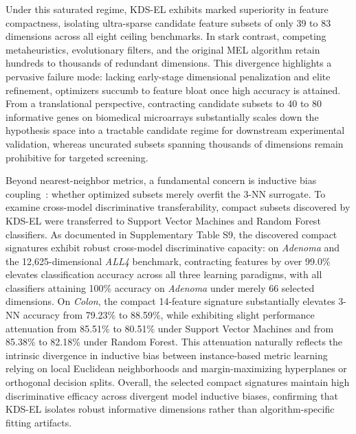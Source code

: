 Under this saturated regime, KDS-EL exhibits marked superiority in feature compactness, isolating ultra-sparse candidate feature subsets of only 39 to 83 dimensions across all eight ceiling benchmarks. In stark contrast, competing metaheuristics, evolutionary filters, and the original MEL algorithm retain hundreds to thousands of redundant dimensions. This divergence highlights a pervasive failure mode: lacking early-stage dimensional penalization and elite refinement, optimizers succumb to feature bloat once high accuracy is attained. From a translational perspective, contracting candidate subsets to 40 to 80 informative genes on biomedical microarrays substantially scales down the hypothesis space into a tractable candidate regime for downstream experimental validation, whereas uncurated subsets spanning thousands of dimensions remain prohibitive for targeted screening.

Beyond nearest-neighbor metrics, a fundamental concern is inductive bias coupling~\cite{kohavi1997}: whether optimized subsets merely overfit the 3-NN surrogate. To examine cross-model discriminative transferability, compact subsets discovered by KDS-EL were transferred to Support Vector Machines and Random Forest classifiers. As documented in Supplementary Table S9, the discovered compact signatures exhibit robust cross-model discriminative capacity: on \textit{Adenoma} and the 12{,}625-dimensional \textit{ALL4} benchmark, contracting features by over 99.0\% elevates classification accuracy across all three learning paradigms, with all classifiers attaining 100\% accuracy on \textit{Adenoma} under merely 66 selected dimensions. On \textit{Colon}, the compact 14-feature signature substantially elevates 3-NN accuracy from 79.23\% to 88.59\%, while exhibiting slight performance attenuation from 85.51\% to 80.51\% under Support Vector Machines and from 85.38\% to 82.18\% under Random Forest. This attenuation naturally reflects the intrinsic divergence in inductive bias between instance-based metric learning relying on local Euclidean neighborhoods and margin-maximizing hyperplanes or orthogonal decision splits. Overall, the selected compact signatures maintain high discriminative efficacy across divergent model inductive biases, confirming that KDS-EL isolates robust informative dimensions rather than algorithm-specific fitting artifacts.

